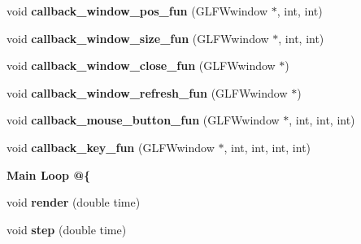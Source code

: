 \begin{DoxyCompactItemize}
\item 
\hypertarget{classNeb_1_1Graphics_1_1Window_1_1Base_ae259e99c30c251c05534b60760ce0afe}{void {\bfseries callback\-\_\-window\-\_\-pos\-\_\-fun} (G\-L\-F\-Wwindow $\ast$, int, int)}\label{classNeb_1_1Graphics_1_1Window_1_1Base_ae259e99c30c251c05534b60760ce0afe}

\item 
\hypertarget{classNeb_1_1Graphics_1_1Window_1_1Base_aa017187b6688141211d6bc5e55aa177a}{void {\bfseries callback\-\_\-window\-\_\-size\-\_\-fun} (G\-L\-F\-Wwindow $\ast$, int, int)}\label{classNeb_1_1Graphics_1_1Window_1_1Base_aa017187b6688141211d6bc5e55aa177a}

\item 
\hypertarget{classNeb_1_1Graphics_1_1Window_1_1Base_abb8bb12eacf4e20902af01c06a37cca8}{void {\bfseries callback\-\_\-window\-\_\-close\-\_\-fun} (G\-L\-F\-Wwindow $\ast$)}\label{classNeb_1_1Graphics_1_1Window_1_1Base_abb8bb12eacf4e20902af01c06a37cca8}

\item 
\hypertarget{classNeb_1_1Graphics_1_1Window_1_1Base_aa369484b62b908065055164d2886e840}{void {\bfseries callback\-\_\-window\-\_\-refresh\-\_\-fun} (G\-L\-F\-Wwindow $\ast$)}\label{classNeb_1_1Graphics_1_1Window_1_1Base_aa369484b62b908065055164d2886e840}

\item 
\hypertarget{classNeb_1_1Graphics_1_1Window_1_1Base_a4066dcc28ad3783ab3f7fa3ebc1ac82d}{void {\bfseries callback\-\_\-mouse\-\_\-button\-\_\-fun} (G\-L\-F\-Wwindow $\ast$, int, int, int)}\label{classNeb_1_1Graphics_1_1Window_1_1Base_a4066dcc28ad3783ab3f7fa3ebc1ac82d}

\item 
\hypertarget{classNeb_1_1Graphics_1_1Window_1_1Base_a5cb1f1c50b2fd077c557ff6967288fba}{void {\bfseries callback\-\_\-key\-\_\-fun} (G\-L\-F\-Wwindow $\ast$, int, int, int, int)}\label{classNeb_1_1Graphics_1_1Window_1_1Base_a5cb1f1c50b2fd077c557ff6967288fba}

\end{DoxyCompactItemize}
\begin{Indent}{\bf Main Loop @\{}\par
\begin{DoxyCompactItemize}
\item 
\hypertarget{classNeb_1_1Graphics_1_1Window_1_1Base_adc53fbf523d1dab863f767c5cb534a77}{void {\bfseries render} (double time)}\label{classNeb_1_1Graphics_1_1Window_1_1Base_adc53fbf523d1dab863f767c5cb534a77}

\item 
\hypertarget{classNeb_1_1Graphics_1_1Window_1_1Base_a2ff51b928fb957a6c48d1a6e973644dd}{void {\bfseries step} (double time)}\label{classNeb_1_1Graphics_1_1Window_1_1Base_a2ff51b928fb957a6c48d1a6e973644dd}

\end{DoxyCompactItemize}
\end{Indent}
